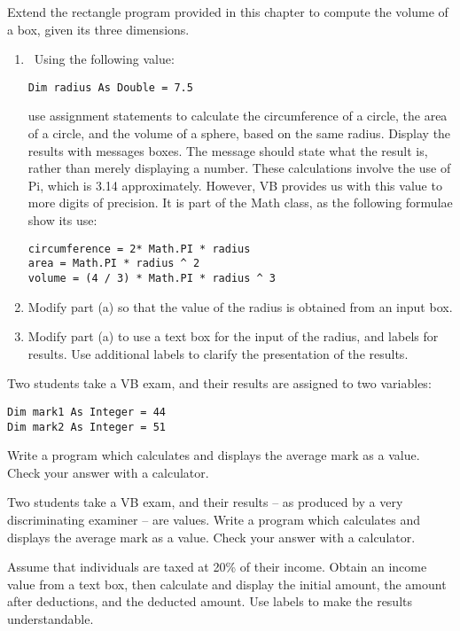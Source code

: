 		\begin{enumChapter}
			\item Extend the rectangle program provided in this chapter to compute the volume of a box, given its three dimensions.
			\item	
				\begin{enumerate}[label=(\alph*)]
					\item Using the following value:
						\begin{lstlisting}
Dim radius As Double = 7.5
						\end{lstlisting}
						use assignment statements to calculate the circumference of a circle, the area of a circle, and the volume of a sphere, based on the same radius. Display the results with messages boxes. The message should state what the result is, rather than merely displaying a number. These calculations involve the use of Pi, which is 3.14 approximately. However, VB provides us with this value to more digits of precision. It is part of the Math class, as the following formulae show its use:
						\begin{lstlisting}
circumference = 2* Math.PI * radius
area = Math.PI * radius ^ 2
volume = (4 / 3) * Math.PI * radius ^ 3
						\end{lstlisting}
					\item Modify part (a) so that the value of the radius is obtained from an input box.
					\item Modify part (a) to use a text box for the input of the radius, and labels for results. Use additional labels to clarify the presentation of the results.
				\end{enumerate}
			\item	Two students take a VB exam, and their results are assigned to two variables:
				\begin{lstlisting}
Dim mark1 As Integer = 44
Dim mark2 As Integer = 51
				\end{lstlisting}
				Write a program which calculates and displays the average mark as a  value. Check your answer with a calculator.
			\item	Two students take a VB exam, and their results – as produced by a very discriminating examiner – are  values. Write a program which calculates and displays the average mark as a  value. Check your answer with a calculator.
			\item	Assume that individuals are taxed at 20\% of their income. Obtain an income value from a text box, then calculate and display the initial amount, the amount after deductions, and the deducted amount. Use labels to make the results understandable.

\end{enumChapter}
